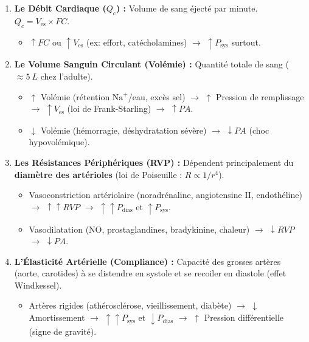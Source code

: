 \documentclass[11pt]{article}
\begin{document}
\begin{propriete}
\begin{enumerate}
    \item \textbf{Le Débit Cardiaque ($Q_c$) :} Volume de sang éjecté par minute. $Q_c = V_{\text{es}} \times FC$.
        \begin{itemize}
            \item $\uparrow FC$ ou $\uparrow V_{\text{es}}$ (ex: effort, catécholamines) $\rightarrow$ $\uparrow P_{\text{sys}}$ surtout.
        \end{itemize}
    \item \textbf{Le Volume Sanguin Circulant (Volémie) :} Quantité totale de sang ($\approx \SI{5}{L}$ chez l'adulte).
        \begin{itemize}
            \item $\uparrow$ Volémie (rétention $\text{Na}^+$/eau, excès sel) $\rightarrow$ $\uparrow$ Pression de remplissage $\rightarrow$ $\uparrow V_{\text{es}}$ (loi de Frank-Starling) $\rightarrow$ $\uparrow PA$.
            \item $\downarrow$ Volémie (hémorragie, déshydratation sévère) $\rightarrow$ $\downarrow PA$ (choc hypovolémique).
        \end{itemize}
    \item \textbf{Les Résistances Périphériques (RVP) :} Dépendent principalement du \textbf{diamètre des artérioles} (loi de Poiseuille : $R \propto 1/r^4$).
        \begin{itemize}
            \item Vasoconstriction artériolaire (noradrénaline, angiotensine II, endothéline) $\rightarrow$ $\uparrow \uparrow RVP$ $\rightarrow$ $\uparrow \uparrow P_{\text{dias}}$ et $\uparrow P_{\text{sys}}$.
            \item Vasodilatation (NO, prostaglandines, bradykinine, chaleur) $\rightarrow$ $\downarrow RVP$ $\rightarrow$ $\downarrow PA$.
        \end{itemize}
    \item \textbf{L'Élasticité Artérielle (Compliance) :} Capacité des grosses artères (aorte, carotides) à se distendre en systole et se recoiler en diastole (effet Windkessel).
        \begin{itemize}
            \item Artères rigides (athérosclérose, vieillissement, diabète) $\rightarrow$ $\downarrow$ Amortissement $\rightarrow$ $\uparrow \uparrow P_{\text{sys}}$ et $\downarrow P_{\text{dias}}$ $\rightarrow$ $\uparrow$ Pression différentielle (signe de gravité).
        \end{itemize}
\end{enumerate}
\end{propriete}
\end{document}
